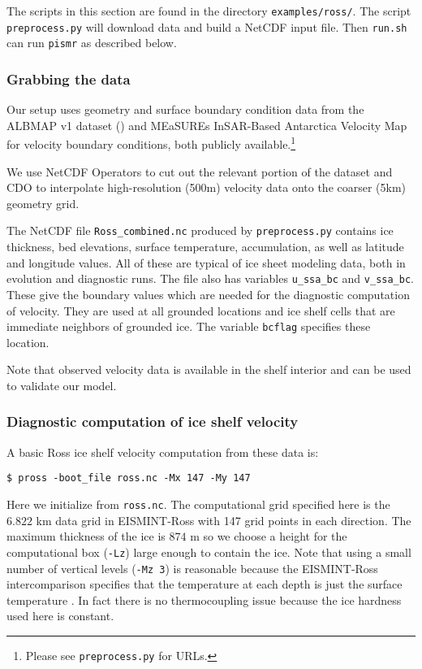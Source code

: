 The scripts in this section are found in the directory \texttt{examples/ross/}.  The script \texttt{preprocess.py} will download data and build a NetCDF input file. Then \texttt{run.sh} can run \texttt{pismr} as described below.

\subsubsection*{Grabbing the data}

Our setup uses geometry and surface boundary condition data from the ALBMAP v1 dataset (\cite{LeBrocqetal2010}) and MEaSUREs InSAR-Based Antarctica Velocity Map for velocity boundary conditions, both publicly available.\footnote{Please see \texttt{preprocess.py} for URLs.}

We use NetCDF Operators to cut out the relevant portion of the dataset and CDO to interpolate high-resolution (500m) velocity data onto the coarser (5km) geometry grid.

The NetCDF file \texttt{Ross_combined.nc} produced by \texttt{preprocess.py} contains ice thickness, bed elevations, surface temperature, accumulation, as well as latitude and longitude values.  All of these are typical of ice sheet modeling data, both in evolution and diagnostic runs.  The file also has variables \texttt{u_ssa_bc} and \texttt{v_ssa_bc}.  These give the boundary values which are needed for the diagnostic computation of velocity. They are used at all grounded locations and ice shelf cells that are immediate neighbors of grounded ice.
The variable \texttt{bcflag} specifies these location.

Note that observed velocity data is available in the shelf interior and can be used to validate our model.

\subsubsection*{Diagnostic computation of ice shelf velocity}
A basic Ross ice shelf velocity computation from these data is:

\begin{verbatim}
$ pross -boot_file ross.nc -Mx 147 -My 147
\end{verbatim}%
Here we initialize from \texttt{ross.nc}. The computational grid specified here is the $6.822$ km data grid in EISMINT-Ross with 147 grid points in each direction.  The maximum thickness of the ice is $874$ m so we choose a height for the computational box (\texttt{-Lz}) large enough to contain the ice.  Note that using a small number of vertical levels (\texttt{-Mz 3}) is reasonable because the EISMINT-Ross intercomparison specifies that the temperature at each depth is just the surface temperature \cite{MacAyealetal}.  In fact there is no thermocoupling issue because the ice hardness used here is constant.

